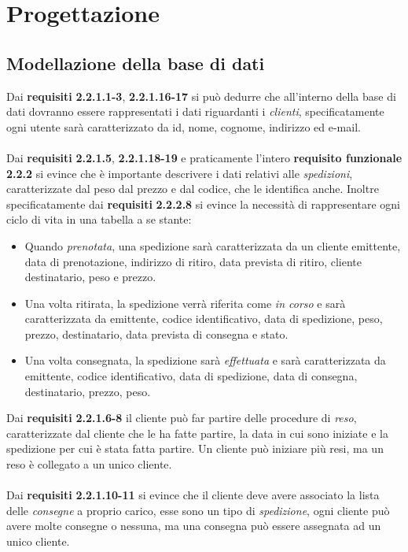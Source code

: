 \newpage
\section{Progettazione}
\subsection{Modellazione della base di dati}
Dai \textbf{requisiti} \textbf{2.2.1.1-3}, \textbf{2.2.1.16-17} si può dedurre che all'interno della base di dati dovranno essere rappresentati
i dati riguardanti i \textit{clienti}, specificatamente ogni utente sarà caratterizzato da id, nome, cognome, indirizzo ed e-mail. 
\\\\
Dai \textbf{requisiti} \textbf{2.2.1.5}, \textbf{2.2.1.18-19} e praticamente l'intero \textbf{requisito funzionale }\textbf{2.2.2} si evince che è importante descrivere i dati relativi alle \textit{spedizioni}, caratterizzate dal peso dal prezzo e dal codice, che le identifica anche. Inoltre specificatamente dai \textbf{requisiti} \textbf{2.2.2.8} si evince la necessità di rappresentare ogni ciclo di vita in una tabella a se stante:
\begin{itemize}
	\item Quando \textit{prenotata}, una spedizione sarà caratterizzata da un cliente emittente, data di prenotazione, 
	indirizzo di ritiro, data prevista di ritiro, cliente destinatario, peso e prezzo.
	
	\item Una volta ritirata, la spedizione verrà riferita come \textit{in corso} e sarà caratterizzata da emittente, 
	codice identificativo, data di spedizione, peso, prezzo, destinatario, data prevista di consegna e stato.
	
	\item Una volta consegnata, la spedizione sarà \textit{effettuata} e sarà caratterizzata da emittente, codice identificativo, 
	data di spedizione, data di consegna, destinatario, prezzo, peso.
\end{itemize}  
Dai \textbf{requisiti} \textbf{2.2.1.6-8} il cliente può far partire delle procedure di \textit{reso}, caratterizzate dal cliente che le ha fatte partire, la data in cui sono iniziate e la spedizione per cui è stata fatta partire. Un cliente può iniziare più resi, ma un reso è collegato a un unico cliente.
\\\\
Dai \textbf{requisiti} \textbf{2.2.1.10-11} si evince che il cliente deve avere associato la lista delle \textit{consegne} a proprio carico,  esse sono un tipo di \textit{spedizione}, ogni cliente può avere molte consegne o nessuna, ma una consegna può essere assegnata ad un unico cliente.
